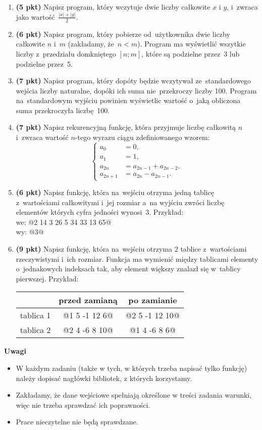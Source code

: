 \documentclass[12pt]{article}
\begin{document}
\begin{enumerate}
\item \textbf{(5 pkt)} Napisz program, który wczytuje dwie liczby całkowite $x$ i $y$, i~zwraca jako wartość~$\frac{|x|+|y|}{2}$.
\item \textbf{(6 pkt)} Napisz program, który pobierze od~użytkownika dwie liczby całkowite $n$ i~$m$
	(zakładamy, że~$n < m$). Program ma wyświetlić wszytkie liczby z~przedziału domkniętego $[n; m]$,
	które są podzielne przez~3 lub podzielne przez~5.
\item \textbf{(7 pkt)} Napisz program, który dopóty będzie wczytywał ze~standardowego wejścia liczby naturalne,
	dopóki ich suma nie~przekroczy liczby 100. Program na~standardowym wyjściu powinien
	wyświetlic wartość o~jaką obliczona suma przekroczyła liczbę~100.

\item  \textbf{(7 pkt)}
Napisz rekurencyjną funkcję, która przyjmuje liczbę całkowitą $n$ i~zwraca wartość $n$-tego wyrazu ciągu zdefiniowanego wzorem:
$$
\begin{cases}
	a_0 & = 0,\\
	a_1 & = 1,\\
	a_{2n} & = a_{2n-1} + a_{2n-2},\\
	a_{2n+1} & = a_{2n} - a_{2n-1}.
\end{cases}
$$

\item \textbf{(6 pkt)}
Napisz funkcję, która na~wejściu otrzyma jedną tablicę z~wartościami całkowitymi
i~jej rozmiar a~na wyjściu zwróci liczbę elementów których cyfra jedności wynosi~3.
Przykład:\\
we: @2 14 3 26 5 34 33 13 65@\\
wy: @3@

\item \textbf{(9 pkt)}
Napisz funkcję, która na~wejściu otrzyma 2 tablice z~wartościami rzeczywistymi i~ich rozmiar.
Funkcja ma wymienić między tablicami elementy o~jednakowych indeksach tak, aby element większy znalazł się w~tablicy pierwszej.
Przykład:\\
\vspace{-0.5cm}
\begin{center}
\begin{tabular}{r | c | c}
		& przed zamianą 	& po zamianie\\ \hline
tablica 1	& @1 5 -1 12  6@ 	& @2 5 -1 12 10@\\
tablica 2	& @2 4 -6  8 10@ 	& @1 4 -6  8  6@
\end{tabular}
\end{center}
\end{enumerate}

\vfill

\textbf{Uwagi}
\begin{itemize}
 \item W każdym zadaniu (także w tych, w których trzeba napisać tylko funkcję) należy dopisać nagłówki bibliotek, z których korzystamy.
 \item Zakładamy, że dane wejściowe spełniają określone w treści zadania warunki, więc nie trzeba sprawdzać ich poprawności.
 \item Prace nieczytelne nie będą sprawdzane.

\end{itemize}
\end{document}
